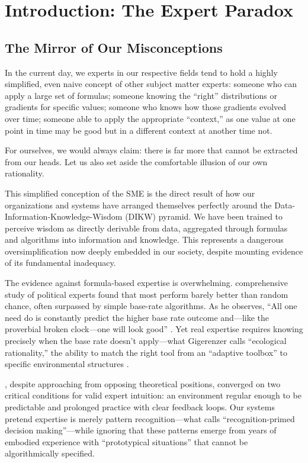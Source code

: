 \section{Introduction: The Expert Paradox}

\subsection{The Mirror of Our Misconceptions}

In the current day, we experts in our respective fields tend to hold a highly simplified, even naive concept of other subject matter experts: someone who can apply a large set of formulas; someone knowing the ``right'' distributions or gradients for specific values; someone who knows how those gradients evolved over time; someone able to apply the appropriate ``context,'' as one value at one point in time may be good but in a different context at another time not.

For ourselves, we would always claim: there is far more that cannot be extracted from our heads. Let us also set aside the comfortable illusion of our own rationality.

This simplified conception of the SME is the direct result of how our organizations and systems have arranged themselves perfectly around the Data-Information-Knowledge-Wisdom (DIKW) pyramid. We have been trained to perceive wisdom as directly derivable from data, aggregated through formulas and algorithms into information and knowledge. This represents a dangerous oversimplification now deeply embedded in our society, despite mounting evidence of its fundamental inadequacy.

The evidence against formula-based expertise is overwhelming. \citet{tetlock2005} comprehensive study of political experts found that most perform barely better than random chance, often surpassed by simple base-rate algorithms. As he observes, ``All one need do is constantly predict the higher base rate outcome and---like the proverbial broken clock---one will look good'' \citep{tetlock2005}. Yet real expertise requires knowing precisely when the base rate doesn't apply---what Gigerenzer calls ``ecological rationality,'' the ability to match the right tool from an ``adaptive toolbox'' to specific environmental structures \citep{gigerenzer2001}.

\citet{kahneman2009}, despite approaching from opposing theoretical positions, converged on two critical conditions for valid expert intuition: an environment regular enough to be predictable and prolonged practice with clear feedback loops. Our systems pretend expertise is merely pattern recognition---what \citet{klein1993} calls ``recognition-primed decision making''---while ignoring that these patterns emerge from years of embodied experience with ``prototypical situations'' that cannot be algorithmically specified.

